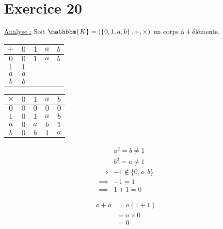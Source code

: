 \part{Exercice 20}

\underline{\large Analyse :}
Soit $\mathbbm{K} = \left( \left\{ 0,1,a,b \right\},+,\times  \right)$ un corps à 4 éléments.\\

\begin{center}
	\begin{tabular}
		{|c|c|c|c|c|}
		\hline
		$+$&$0$&$1$&$a$&$b$\\ \hline
		$0$&$0$&$1$&$a$&$b$\\ \hline
		$1$&$1$&\diagbox{$b$}{$0$}&\diagbox{$0$}{$b$}&\diagbox{$a$}{$a$}\\ \hline
		$a$&$a$&\diagbox{$0$}{$b$}&\diagbox{$b$}{$1$}&\diagbox{$1$}{$\quad$}\\ \hline
		$b$&$b$&\diagbox{$a$}{$a$}&\diagbox{$1$}{$\quad$}&\diagbox{$0$}{$\quad$}\\ \hline
	\end{tabular}
\end{center}

\begin{center}
	\begin{tabular}{|c|c|c|c|c|}
		\hline
		$\times$& $0$ & $1$& $a$ & $b$ \\ \hline
		$0$ &$0$ &$0$ &$0$&$0$ \\ \hline
		$1$ &$0$ &$1$ &$a$ &$b$ \\ \hline
		$a$ &$0$ &$a$ &$b$ &$1$\\ \hline
		$b$ &$0$ &$b$ &$1$ &$a$ \\ \hline
	\end{tabular}
\end{center}

\begin{align*}
	&a^2=b \neq 1\\
	&b^2 = a \neq 1\\
	\implies&-1\not\in \{0,a,b\} \\
	\implies&-1=1\\
	\implies&1+1=0
\end{align*}

\begin{align*}
	a+a &= a(1+1) \\
	&= a\times 0 \\
	&= 0 \\
\end{align*}


